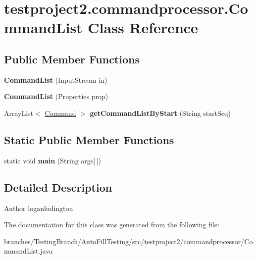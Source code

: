 \hypertarget{classtestproject2_1_1commandprocessor_1_1CommandList}{\section{testproject2.\-commandprocessor.\-Command\-List Class Reference}
\label{classtestproject2_1_1commandprocessor_1_1CommandList}
}
\subsection*{Public Member Functions}
\begin{DoxyCompactItemize}
\item 
\hypertarget{classtestproject2_1_1commandprocessor_1_1CommandList_ae3c340ca38ce23e3c026dc4ec1ff3891}{{\bfseries Command\-List} (Input\-Stream in)}\label{classtestproject2_1_1commandprocessor_1_1CommandList_ae3c340ca38ce23e3c026dc4ec1ff3891}

\item 
\hypertarget{classtestproject2_1_1commandprocessor_1_1CommandList_a43516f4d81794adfbee759ee0763a775}{{\bfseries Command\-List} (Properties prop)}\label{classtestproject2_1_1commandprocessor_1_1CommandList_a43516f4d81794adfbee759ee0763a775}

\item 
\hypertarget{classtestproject2_1_1commandprocessor_1_1CommandList_ad4b9524cdeab36f12d1890feb921ea85}{Array\-List$<$ \hyperlink{classtestproject2_1_1commandprocessor_1_1Command}{Command} $>$ {\bfseries get\-Command\-List\-By\-Start} (String start\-Seq)}\label{classtestproject2_1_1commandprocessor_1_1CommandList_ad4b9524cdeab36f12d1890feb921ea85}

\end{DoxyCompactItemize}
\subsection*{Static Public Member Functions}
\begin{DoxyCompactItemize}
\item 
\hypertarget{classtestproject2_1_1commandprocessor_1_1CommandList_a9ec9737b9aca3f4cd3d38d59a7ccda0e}{static void {\bfseries main} (String args\mbox{[}$\,$\mbox{]})}\label{classtestproject2_1_1commandprocessor_1_1CommandList_a9ec9737b9aca3f4cd3d38d59a7ccda0e}

\end{DoxyCompactItemize}


\subsection{Detailed Description}
\begin{DoxyAuthor}{Author}
loganludington 
\end{DoxyAuthor}


The documentation for this class was generated from the following file\-:\begin{DoxyCompactItemize}
\item 
branches/\-Testing\-Branch/\-Auto\-Fill\-Testing/src/testproject2/commandprocessor/Command\-List.\-java\end{DoxyCompactItemize}
